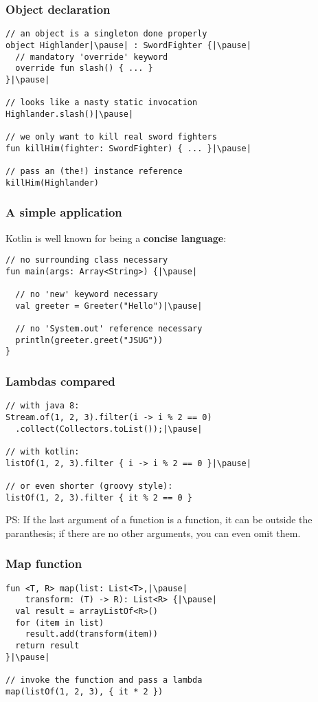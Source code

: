 \begin{frame}[fragile] \frametitle{Object declaration}
\pause
\begin{lstlisting}
// an object is a singleton done properly
object Highlander|\pause| : SwordFighter {|\pause|
  // mandatory 'override' keyword
  override fun slash() { ... }
}|\pause|

// looks like a nasty static invocation
Highlander.slash()|\pause|

// we only want to kill real sword fighters
fun killHim(fighter: SwordFighter) { ... }|\pause|

// pass an (the!) instance reference
killHim(Highlander)
\end{lstlisting}
\end{frame}


\begin{frame}[fragile] \frametitle{A simple application}
Kotlin is well known for being a \textbf{concise language}:\pause
\begin{lstlisting}
// no surrounding class necessary
fun main(args: Array<String>) {|\pause|

  // no 'new' keyword necessary
  val greeter = Greeter("Hello")|\pause|

  // no 'System.out' reference necessary
  println(greeter.greet("JSUG"))
}
\end{lstlisting}
\end{frame}

\begin{frame}[fragile] \frametitle{Lambdas compared}
\pause
\begin{lstlisting}
// with java 8:
Stream.of(1, 2, 3).filter(i -> i % 2 == 0)
  .collect(Collectors.toList());|\pause|

// with kotlin:
listOf(1, 2, 3).filter { i -> i % 2 == 0 }|\pause|

// or even shorter (groovy style):
listOf(1, 2, 3).filter { it % 2 == 0 }
\end{lstlisting}
\pause
\small{PS: If the last argument of a function is a function, it can be outside the paranthesis; if there are no other arguments, you can even omit them.}
\end{frame}

\begin{frame}[fragile] \frametitle{Map function}
\pause
\begin{lstlisting}
fun <T, R> map(list: List<T>,|\pause|
    transform: (T) -> R): List<R> {|\pause|
  val result = arrayListOf<R>()
  for (item in list)
    result.add(transform(item))
  return result
}|\pause|

// invoke the function and pass a lambda
map(listOf(1, 2, 3), { it * 2 })
\end{lstlisting}
\end{frame}

